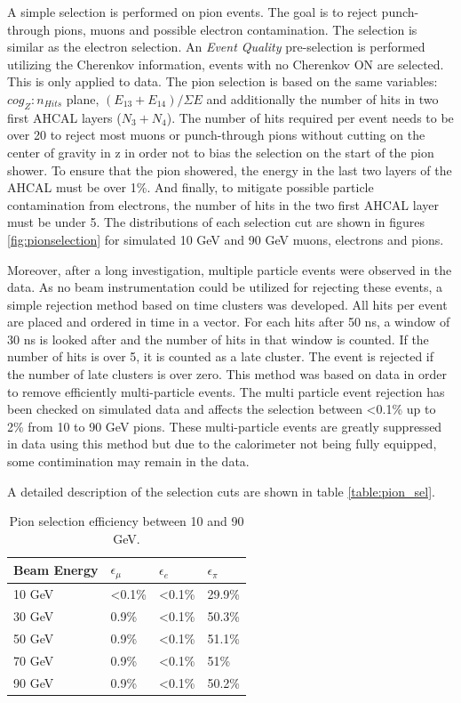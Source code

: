 A simple selection is performed on pion events. The goal is to reject punch-through pions, muons and possible electron contamination. The selection is similar as the electron selection. An \textit{Event Quality} pre-selection is performed utilizing the Cherenkov information, events with no Cherenkov ON are selected. This is only applied to data. The pion selection is based on the same variables: $cog_Z:n_{Hits}$ plane, $(E_{13}+E_{14})/\Sigma E$ and additionally the number of hits in two first AHCAL layers ($N_3+N_4$). The number of hits required per event needs to be over 20 to reject most muons or punch-through pions without cutting on the center of gravity in z in order not to bias the selection on the start of the pion shower. To ensure that the pion showered, the energy in the last two layers of the AHCAL must be over 1\%. And finally, to mitigate possible particle contamination from electrons, the number of hits in the two first AHCAL layer must be under 5. The distributions of each selection cut are shown in figures \ref{fig:pionselection} for simulated 10 GeV and 90 GeV muons, electrons and pions.

Moreover, after a long investigation, multiple particle events were observed in the data. As no beam instrumentation could be utilized for rejecting these events, a simple rejection method based on time clusters was developed. All hits per event are placed and ordered in time in a vector. For each hits after 50 ns, a window of 30 ns is looked after and the number of hits in that window is counted. If the number of hits is over 5, it is counted as a late cluster. The event is rejected if the number of late clusters is over zero. This method was based on data in order to remove efficiently multi-particle events. The multi particle event rejection has been checked on simulated data and affects the selection between <0.1\% up to 2\% from 10 to 90 GeV pions.
These multi-particle events are greatly suppressed in data using this method but due to the calorimeter not being fully equipped, some contimination may remain in the data.

A detailed description of the selection cuts are shown in table \ref{table:pion_sel}.

\begin{table}[htb!]
	\centering
	\caption{Pion selection efficiency between 10 and 90 GeV.}
	\label{table:eff_electron}
	\begin{tabular}{@{} llll @{}}
		\hline
		\textbf{Beam Energy} & \textbf{$\epsilon_{\mu}$} & \textbf{$\epsilon_{e}$} & \textbf{$\epsilon_{\pi}$}\\
		\hline
		10 GeV & <0.1\% & <0.1\% & 29.9\%\\
		30 GeV & 0.9\% & <0.1\% & 50.3\%\\
		50 GeV & 0.9\% & <0.1\% & 51.1\%\\
		70 GeV & 0.9\% & <0.1\% & 51\%\\
		90 GeV & 0.9\% & <0.1\% & 50.2\%\\
		\hline
	\end{tabular}
\end{table}

